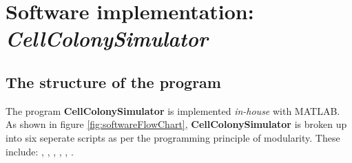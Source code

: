 
\chapter{Software implementation: \textit{CellColonySimulator}}

\section{The structure of the program}
The program \textbf{CellColonySimulator} is implemented \textit{in-house} with MATLAB. As shown in 
figure \ref{fig:softwareFlowChart}, \textbf{CellColonySimulator} is broken up 
into six seperate scripts as per the programming principle of modularity. These include:
,
,
,
,
,
.


